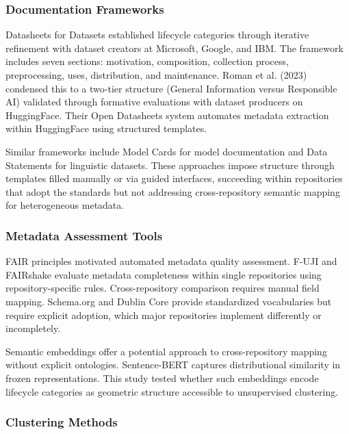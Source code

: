 
\subsubsection{Documentation Frameworks}

Datasheets for Datasets \citep{Gebru2018} established lifecycle categories through iterative refinement with dataset creators at Microsoft, Google, and IBM. The framework includes seven sections: motivation, composition, collection process, preprocessing, uses, distribution, and maintenance. Roman et al. (2023) condensed this to a two-tier structure (General Information versus Responsible AI) validated through formative evaluations with dataset producers on HuggingFace. Their Open Datasheets system automates metadata extraction within HuggingFace using structured templates.

Similar frameworks include Model Cards \citep{Mitchell2019} for model documentation and Data Statements \citep{Bender2018} for linguistic datasets. These approaches impose structure through templates filled manually or via guided interfaces, succeeding within repositories that adopt the standards but not addressing cross-repository semantic mapping for heterogeneous metadata.

\subsubsection{Metadata Assessment Tools}

FAIR principles \citep{Wilkinson2016} motivated automated metadata quality assessment. F-UJI \citep{Devaraju2021} and FAIRshake \citep{Clarke2019} evaluate metadata completeness within single repositories using repository-specific rules. Cross-repository comparison requires manual field mapping. Schema.org and Dublin Core provide standardized vocabularies but require explicit adoption, which major repositories implement differently or incompletely.

Semantic embeddings offer a potential approach to cross-repository mapping without explicit ontologies. Sentence-BERT \citep{Reimers2019} captures distributional similarity in frozen representations. This study tested whether such embeddings encode lifecycle categories as geometric structure accessible to unsupervised clustering.

\subsubsection{Clustering Methods}

